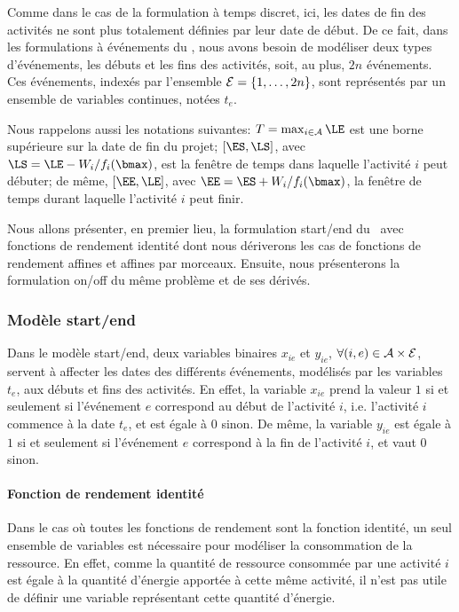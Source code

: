 Comme dans le cas de la formulation à temps discret, ici, les dates de
fin des activités ne sont plus totalement définies par leur date de
début. De ce fait, dans les formulations à événements du \CECSP, nous
avons besoin de modéliser deux types d'événements, les débuts et les
fins des activités, soit, au plus, $2n$ événements. Ces événements,
indexés par l'ensemble ${\cal E}=\{1,\dots,2n\}$, sont représentés par un
ensemble de variables continues, notées $t_e$.

Nous rappelons aussi les notations suivantes: $T=\max_{i \in \A}
\LE$ est une borne supérieure sur la date de fin du projet;
$[\ES,\LS]$, avec $\LS= \LE-W_i/f_i(\bmax)$, est la fenêtre de temps
dans laquelle l'activité $i$ peut débuter; de même, $[\EE,\LE]$,
avec $\EE=\ES + W_i/f_i(\bmax)$, la fenêtre de temps durant laquelle
l'activité $i$ peut finir.

Nous allons présenter, en premier lieu, la formulation start/end du
\CECSP~avec fonctions de rendement identité dont nous dériverons 
les cas de fonctions de rendement affines et affines par morceaux.
Ensuite, nous présenterons la formulation on/off du même problème et
de ses dérivés.

\subsubsection{Modèle start/end}

Dans le modèle start/end, deux variables binaires $x_{ie}$ et
$y_{ie}$, $\forall (i,e) \in {\cal A}\times {\cal E}$, 
servent à affecter les dates des différents événements, modélisés par
les variables $t_e$, aux débuts et fins des activités. En effet, la
variable $x_{ie}$ prend la valeur $1$ si et seulement si l'événement
$e$ correspond au début de l'activité $i$, i.e. l'activité $i$
commence à la date $t_e$, et est égale à $0$ sinon. De même, la
variable $y_{ie}$ est égale à $1$ si et seulement si l'événement $e$
correspond à la fin de l'activité $i$, et vaut $0$ sinon.

\paragraph{Fonction de rendement identité}

Dans le cas où toutes les fonctions de rendement sont la fonction
identité, un seul ensemble de variables est nécessaire pour modéliser
la consommation de la ressource. En effet, comme la quantité de
ressource consommée par une activité $i$ est égale à la quantité
d'énergie apportée à cette même activité, il n'est pas utile de
définir une variable représentant cette quantité d'énergie.


